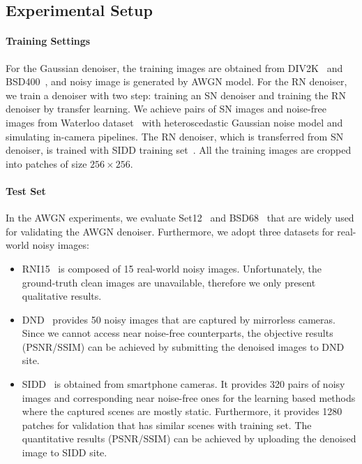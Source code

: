 \documentclass[10pt,twocolumn,letterpaper]{article}
\begin{document}
\subsection{Experimental Setup}
\paragraph{Training Settings}
For the Gaussian denoiser, the training images are obtained from DIV2K~\cite{timofte2017ntire} and BSD400~\cite{martin2001database}, and noisy image is generated by AWGN model.
For the RN denoiser, we train a denoiser with two step: training an SN denoiser and training the RN denoiser by transfer learning. 
We achieve pairs of SN images and noise-free images from Waterloo dataset~\cite{ma2016waterloo} with heteroscedastic Gaussian noise model and simulating in-camera pipelines.
The RN denoiser, which is transferred from SN denoiser, is trained with SIDD training set~\cite{abdelhamed2018high}.
All the training images are cropped into patches of size $256 \times 256$.

\paragraph{Test Set}
In the AWGN experiments, we evaluate Set12~\cite{zhang2017beyond} and BSD68~\cite{roth2009fields} that are widely used for validating the AWGN denoiser.
Furthermore, we adopt three datasets for real-world noisy images:
\begin{itemize}
	\item RNI15~\cite{lebrun2015noise} is composed of 15 real-world noisy images. Unfortunately, the ground-truth clean images are unavailable, therefore we only present qualitative results.
	
	\item DND~\cite{plotz2017benchmarking} provides 50 noisy images that are captured by mirrorless cameras. 
	Since we cannot access near noise-free counterparts, the objective results (PSNR/SSIM) can be achieved by submitting the denoised images to DND site. 	
	
	\item SIDD~\cite{abdelhamed2018high} is obtained from smartphone cameras. 
	It provides 320 pairs of noisy images and corresponding near noise-free ones for the learning based methods where the captured scenes are mostly static.
	Furthermore, it provides 1280 patches for validation that has similar scenes with training set.
	The quantitative results (PSNR/SSIM) can be achieved by uploading the denoised image to SIDD site. 
\end{itemize}
 
\end{document}
